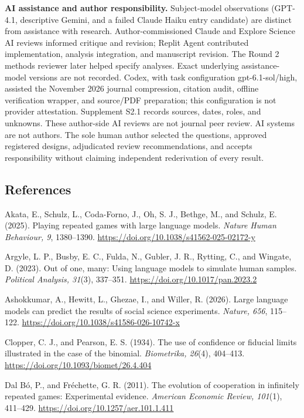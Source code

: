 \documentclass[11pt]{article}
\begin{document}
\textbf{AI assistance and author responsibility.} Subject-model
observations (GPT-4.1, descriptive Gemini, and a failed Claude Haiku
entry candidate) are distinct from assistance with research.
Author-commissioned Claude and Explore Science AI reviews informed
critique and revision; Replit Agent contributed implementation, analysis
integration, and manuscript revision. The Round 2 methods reviewer later
helped specify analyses. Exact underlying assistance-model versions are
not recorded. Codex, with task configuration gpt-6.1-sol/high, assisted
the November 2026 journal compression, citation audit, offline
verification wrapper, and source/PDF preparation; this configuration is
not provider attestation. Supplement S2.1 records sources, dates, roles,
and unknowns. These author-side AI reviews are not journal peer review.
AI systems are not authors. The sole human author selected the
questions, approved registered designs, adjudicated review
recommendations, and accepts responsibility without claiming independent
rederivation of every result.

\begingroup\small\setlength{\parskip}{0.5pt}\setlength{\baselineskip}{11pt}\subsection{References}\label{references}

Akata, E., Schulz, L., Coda-Forno, J., Oh, S. J., Bethge, M., and
Schulz, E. (2025). Playing repeated games with large language models.
\emph{Nature Human Behaviour, 9}, 1380--1390.
\url{https://doi.org/10.1038/s41562-025-02172-y}

Argyle, L. P., Busby, E. C., Fulda, N., Gubler, J. R., Rytting, C., and
Wingate, D. (2023). Out of one, many: Using language models to simulate
human samples. \emph{Political Analysis, 31}(3), 337--351.
\url{https://doi.org/10.1017/pan.2023.2}

Ashokkumar, A., Hewitt, L., Ghezae, I., and Willer, R. (2026). Large
language models can predict the results of social science experiments.
\emph{Nature, 656}, 115--122.
\url{https://doi.org/10.1038/s41586-026-10742-x}

Clopper, C. J., and Pearson, E. S. (1934). The use of confidence or
fiducial limits illustrated in the case of the binomial.
\emph{Biometrika, 26}(4), 404--413.
\url{https://doi.org/10.1093/biomet/26.4.404}

Dal Bó, P., and Fréchette, G. R. (2011). The evolution of cooperation in
infinitely repeated games: Experimental evidence. \emph{American
Economic Review, 101}(1), 411--429.
\url{https://doi.org/10.1257/aer.101.1.411}
\end{document}

